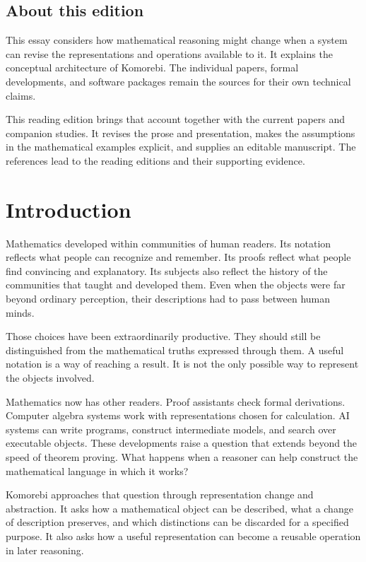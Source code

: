 \documentclass[11pt,oneside,openany]{book}
\begin{document}
\section*{About this edition}
This essay considers how mathematical reasoning might change when a system can revise the representations and operations available to it. It explains the conceptual architecture of Komorebi. The individual papers, formal developments, and software packages remain the sources for their own technical claims.

This reading edition brings that account together with the current papers and companion studies. It revises the prose and presentation, makes the assumptions in the mathematical examples explicit, and supplies an editable manuscript. The references lead to the reading editions and their supporting evidence.

\begingroup\small\setlength{\parskip}{0pt}\tableofcontents\endgroup\clearpage\mainmatter
\chapter{Introduction}
Mathematics developed within communities of human readers. Its notation reflects what people can recognize and remember. Its proofs reflect what people find convincing and explanatory. Its subjects also reflect the history of the communities that taught and developed them. Even when the objects were far beyond ordinary perception, their descriptions had to pass between human minds.

Those choices have been extraordinarily productive. They should still be distinguished from the mathematical truths expressed through them. A useful notation is a way of reaching a result. It is not the only possible way to represent the objects involved.

Mathematics now has other readers. Proof assistants check formal derivations. Computer algebra systems work with representations chosen for calculation. AI systems can write programs, construct intermediate models, and search over executable objects. These developments raise a question that extends beyond the speed of theorem proving. What happens when a reasoner can help construct the mathematical language in which it works?

Komorebi approaches that question through representation change and abstraction. It asks how a mathematical object can be described, what a change of description preserves, and which distinctions can be discarded for a specified purpose. It also asks how a useful representation can become a reusable operation in later reasoning.
\end{document}
